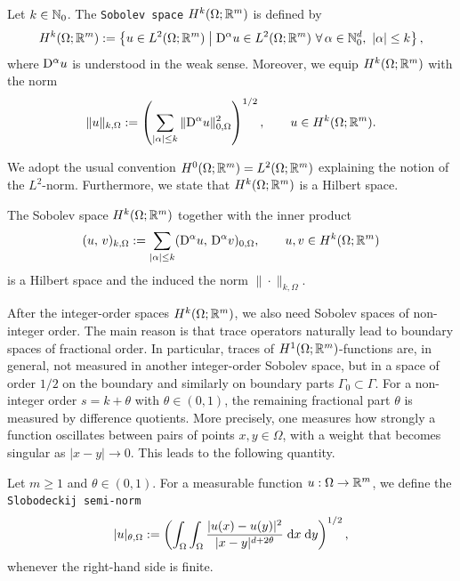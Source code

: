 \begin{definition}
	Let $k\in{\mathbb N}_0$. The {\tt Sobolev space} $H^k(\Omega;{\mathbb R}^m)$ is defined by
	\begin{equation*}
		H^k(\Omega;{\mathbb R}^m)
		:=
		\left\{u\in L^2(\Omega;{\mathbb R}^m)\;\middle|\; {\mathrm{D}}^\alpha u\in L^2(\Omega;{\mathbb R}^m)\ \forall\,\alpha\in{\mathbb N}_0^d,\ |\alpha|\le k\right\},
	\end{equation*}
	where ${\mathrm{D}}^\alpha u$ is understood in the weak sense. Moreover, we equip $H^k(\Omega;{\mathbb R}^m)$ with the norm
	\begin{equation*}
		\|u\|_{k,\Omega}
		:=
		\left(
		\sum_{|\alpha|\le k}\|{\mathrm{D}}^\alpha u\|_{0,\Omega}^2
		\right)^{1/2},
		\qquad u\in H^k(\Omega;{\mathbb R}^m).
	\end{equation*}
\end{definition}

We adopt the usual convention $H^0(\Omega;{\mathbb R}^m) = L^2(\Omega;{\mathbb R}^m)$ explaining the notion of the $L^2$-norm. Furthermore, we state that $H^k(\Omega;{\mathbb R}^m)$ is a Hilbert space.

\begin{proposition}
	The Sobolev space $H^k(\Omega;{\mathbb R}^m)$ together with the inner product
	\begin{equation*}
		(u,\, v)_{k,\Omega}:= \sum_{|\alpha|\le k}({\mathrm{D}}^\alpha u,\, {\mathrm{D}}^\alpha v)_{0,\Omega},\qquad u,v\in H^k(\Omega;{\mathbb R}^m)
	\end{equation*}
	is a Hilbert space and the induced the norm $\|\cdot\|_{k,\Omega}$.
	\eop
\end{proposition}
After the integer-order spaces $H^k(\Omega;{\mathbb R}^m)$, we also need Sobolev spaces of non-integer order. The main reason is that trace operators naturally lead to boundary spaces of fractional order. In particular, traces of $H^1(\Omega;{\mathbb R}^m)$-functions are, in general, not measured in another integer-order Sobolev space, but in a space of order $1/2$ on the boundary and similarly on boundary parts $\Gamma_0\subset\Gamma$. For a non-integer order $s=k+\theta$ with $\theta\in(0,1)$, the remaining fractional part $\theta$ is measured by difference quotients. More precisely, one measures how strongly a function oscillates between pairs of points $x,y\in\Omega$, with a weight that becomes singular as $|x-y|\to 0$. This leads to the following quantity.

\begin{definition}
	Let $m\ge 1$ and $\theta\in(0,1)$. For a measurable function $u:\Omega\to {\mathbb R}^m$, we define the {\tt Slobodeckij semi-norm}
	\begin{equation*}
		|u|_{\theta,\Omega}
		:=
		\left(\int_\Omega\int_\Omega \frac{|u(x)-u(y)|^2}{|x-y|^{d+2\theta}}\;{{\mathrm{d}} x}\;{{\mathrm{d}} y}\right)^{1/2},
	\end{equation*}
	whenever the right-hand side is finite.
\end{definition}

